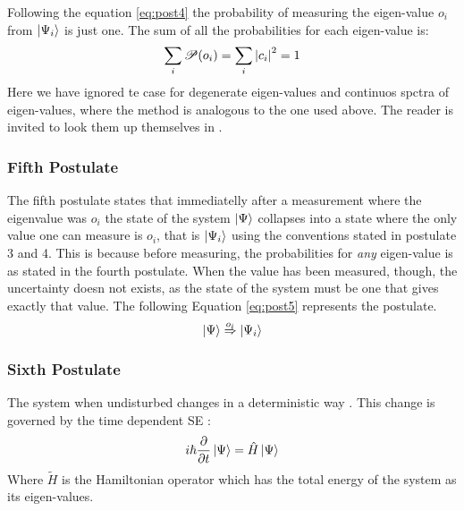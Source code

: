 \documentclass[../master_thesis.tex]{subfiles}
\begin{document}
Following the equation \ref{eq:post4} the probability of measuring the
eigen-value $o_i$ from $\ket{\Psi_i}$ is just one. The sum of all the probabilities
for each eigen-value is:
\begin{equation}
  \sum_i\mathscr{P}(o_i) = \sum_i \abs{c_i}^2 = 1
\end{equation}
Here we have ignored te case for degenerate eigen-values and continuos spctra of
eigen-values, where the method is analogous to the one used above. The reader is
invited to look them up themselves in \cite{Cohen:1973, Atkins:2011}.

\subsubsection{Fifth Postulate}
The fifth postulate states that immediatelly after a measurement where the eigenvalue was $o_i$
the state of the system $\ket{\Psi}$ collapses into a state where the only value one
can measure is $o_i$, that is $ \ket{\Psi_i} $ using the conventions stated in postulate 3 and 4.
This is because before measuring, the probabilities for \textit{any} eigen-value
is as stated in the fourth postulate. When the value has been measured, though,
the uncertainty doesn not exists, as the state of the system must be one that gives
exactly that value. The following Equation \ref{eq:post5} represents the postulate.
\begin{equation}\label{eq:post5}
  \ket{\Psi} \stackrel{o_i}{\Rightarrow} \ket{\Psi_i}
\end{equation}

\subsubsection{Sixth Postulate}
The system when undisturbed changes in a deterministic way \cite{Cohen:1973}.
This change is governed by the time dependent \ac{SE} \cite{Cohen:1973, Atkins:2011}:
\begin{equation}\label{eq:tdepSE}
  i\hbar\frac{\partial}{\partial t} \ket{\Psi} = \hat{H}\ket{\Psi}
\end{equation}
Where $\tilde{H}$ is the Hamiltonian operator which has the total energy of the
system as its eigen-values.
\end{document}
